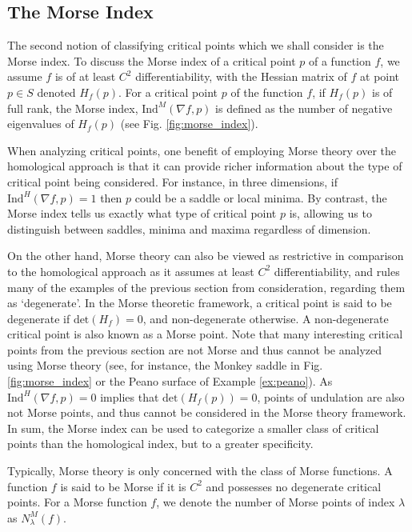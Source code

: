\documentclass[11pt]{article}
\newcommand{\1}{\mathbf{1}}
\theoremstyle{definition}
\theoremstyle{remark}
\begin{document}
\subsection{The Morse Index}\label{sec:morse_notation}

The second notion of classifying critical points which we shall consider is the Morse index. To discuss the Morse index of a critical point $p$ of a function $f$, we assume $f$ is of at least $C^2$ differentiability, with the Hessian matrix of $f$ at point $p\in S$ denoted $H_f(p)$. For a critical point $p$ of the function $f$, if $H_f(p)$ is of full rank, the Morse index, $\text{Ind}^M(\nabla f,p)$ is defined as the number of negative eigenvalues of $H_f(p)$ (see Fig. \ref{fig:morse_index}). 


When analyzing critical points, one benefit of employing Morse theory over the homological approach is that it can provide richer information about the type of critical point being considered. For instance, in three dimensions, if $\text{Ind}^H(\nabla f,p)=1$ then $p$ could be a saddle or local minima. By contrast, the Morse index tells us exactly what type of critical point $p$ is, allowing us to distinguish between saddles, minima and maxima regardless of dimension. 

On the other hand, Morse theory can also be viewed as restrictive in comparison to the homological approach as it assumes at least $C^2$ differentiability, and rules many of the examples of the previous section from consideration, regarding them as `degenerate'. In the Morse theoretic framework, a critical point is said to be degenerate if $\text{det}(H_f)= 0$, and non-degenerate otherwise. A non-degenerate critical point is also known as a Morse point. Note that many interesting critical points from the previous section are not Morse and thus cannot be analyzed using Morse theory (see, for instance, the Monkey saddle in Fig. \ref{fig:morse_index} or the Peano surface of Example \ref{ex:peano}). As $\text{Ind}^H(\nabla f, p)=0$ implies that $\text{det}(H_f(p))=0$, points of undulation are also not Morse points, and thus cannot be considered in the Morse theory framework. In sum, the Morse index can be used to categorize a smaller class of critical points than the homological index, but to a greater specificity.


Typically, Morse theory is only concerned with the class of Morse functions. A function $f$ is said to be Morse if it is $C^2$ and possesses no degenerate critical points. For a Morse function $f$, we denote the number of Morse points of index $\lambda$ as $N^M_\lambda(f)$. 
\end{document}
